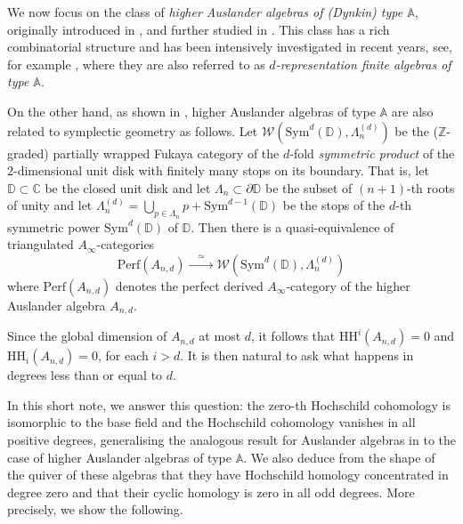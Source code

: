 \documentclass{amsart}
\newcommand{\A}{\mathbb{A}}
\newcommand{\C}{\mathbb{C}}
\newcommand{\D}{\mathbb{D}}
\newcommand{\HH}{\mathrm{HH}}
\theoremstyle{plain}
\theoremstyle{definition}
\numberwithin{equation}{section}
\begin{document}
We now focus on 
the class of {\it higher Auslander algebras of (Dynkin) type $\A$}, originally introduced in \cite{Iyama11}, and further studied  in \cite{OppermannThomas12,JassoKulshammer19,HerschendJorgensen21,DyckerhoffJassoLekili21}.
This class 
has a rich combinatorial structure and has been intensively investigated in recent years, see, for example \cite{HerschendIyama11,IyamaOppermann11,DyckerhoffJassoWalde19}, where they are also referred to as {\it $d$-representation finite algebras of type $\A$}. 

On the other hand, as shown in \cite{DyckerhoffJassoLekili21}, higher Auslander algebras of type $\A$ are  also related to  symplectic geometry as follows. 
Let $\mathcal{W}(\mathrm{Sym}^d(\D),\Lambda_n^{(d)})$ be the ($\mathbb{Z}$-graded) partially wrapped Fukaya category of the $d$-fold {\it symmetric product} of the $2$-dimensional unit disk with finitely many stops on its boundary. That is, let $\D \subset \C$ be the closed unit disk and let $\Lambda_n\subset \partial\D$ be the subset of $(n+1)$-th roots of unity and let $\Lambda_n^{(d)}=\bigcup_{p\in \Lambda_n}p+\mathrm{Sym}^{d-1}(\D)$ be the stops of the  $d$-th symmetric power $\mathrm{Sym}^d(\D)$ of $\D$.
Then there is a quasi-equivalence of triangulated $A_{\infty}$-categories \[ \mathrm{Perf}(A_{n,d})\xrightarrow{\quad\simeq\quad} \mathcal{W}(\mathrm{Sym}^d(\D),\Lambda_n^{(d)}) \]
 where $ \mathrm{Perf}(A_{n,d})$ denotes the perfect derived $A_{\infty}$-category of the higher Auslander algebra $A_{n,d}$. 
 
Since the global dimension of $A_{n,d}$ at most $d$, it follows that  $\HH^i(A_{n,d})=0$ and $\HH_i(A_{n,d})=0$, for each $i>d$. It is then natural to ask what happens in degrees less than or equal to $d$. 

In this short note, we  answer this question: the zero-th Hochschild cohomology is isomorphic to the base field  and the Hochschild cohomology vanishes in all positive degrees, generalising the analogous result for Auslander algebras in \cite{Happel90} to the case of higher Auslander algebras of type $\A$. We also deduce from the shape of the quiver of these algebras that they have Hochschild homology concentrated in degree zero and that their cyclic homology is zero in all odd degrees. More precisely, we show
the following. 
\end{document}
